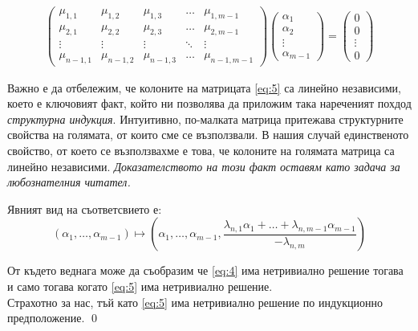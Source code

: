 \documentclass[a4paper,12pt,fleqn]{article}
\begin{document}
      \begin{gather}\label{eq:5}
        \begin{pmatrix}
          \mu_{1, 1} & \mu_{1, 2} & \mu_{1, 3} & \dots & \mu_{1,m-1} \\
          \mu_{2, 1} & \mu_{2, 2} & \mu_{2, 3} & \dots & \mu_{2,m-1} \\
          \vdots & \vdots & \vdots & \ddots & \vdots \\
          \mu_{n-1, 1} & \mu_{n-1, 2} & \mu_{n-1, 3} & \dots & \mu_{n-1,m-1}
        \end{pmatrix}
        \begin{pmatrix}
          \alpha_{1} \\
          \alpha_{2} \\
          \vdots \\
          \alpha_{m-1}
        \end{pmatrix}
        =
        \begin{pmatrix}
          0 \\
          0 \\
          \vdots \\
          0
        \end{pmatrix}
      \end{gather} 

      Важно е да отбележим, че колоните на матрицата \eqref{eq:5} са линейно независими, което е ключовият факт, който ни позволява да приложим така нареченият похдод \textit{структурна индукция}. Интуитивно, по-малката матрица притежава структурните свойства на голямата, от които сме се възползвали. В нашия случай единственото свойство, от което се възползвахме е това, че колоните на голямата матрица са линейно независими. \textit{Доказателството на този факт оставям като задача за любознателния читател.}

      Явният вид на съответсвието е:
      \begin{equation*}
        \left( \alpha_{1},\dots,\alpha_{m-1} \right) \longmapsto \left( \alpha_{1},\dots,\alpha_{m-1}, \frac{\lambda_{n,1}\alpha_{1}+\dots+\lambda_{n,m-1}\alpha_{m-1}}{-\lambda_{n,m}}\right)
      \end{equation*}

      От където веднага може да съобразим че \eqref{eq:4} има нетривиално решение тогава и само тогава когато \eqref{eq:5} има нетривиално решение. \\
      Страхотно за нас, тъй като \eqref{eq:5} има нетривиално решение по индукционно предположение.
      \qed
\end{document}
